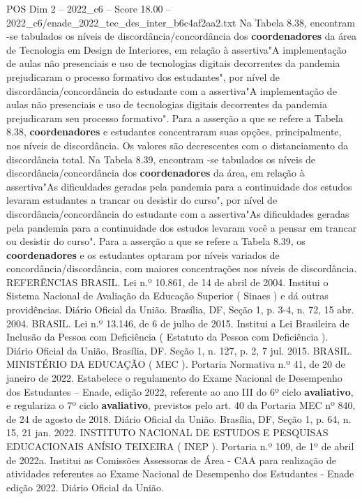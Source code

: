 \begin{textsample}{POS Dim 2 – 2022\_c6 – Score 18.00 – 2022\_c6/enade\_2022\_tec\_des\_inter\_b6c4af2aa2.txt}
Na Tabela 8.38, encontram -se tabulados os níveis de discordância/concordância dos \textbf{coordenadores} da área de Tecnologia em Design de Interiores, em relação à assertiva"A implementação de aulas não presenciais e uso de tecnologias digitais decorrentes da pandemia prejudicaram o processo formativo dos estudantes", por nível de discordância/concordância do estudante com a assertiva"A implementação de aulas não presenciais e uso de tecnologias digitais decorrentes da pandemia prejudicaram seu processo formativo".
Para a asserção a que se refere a Tabela 8.38, \textbf{coordenadores} e estudantes concentraram suas opções, principalmente, nos níveis de discordância.
Os valores são decrescentes com o distanciamento da discordância total.
Na Tabela 8.39, encontram -se tabulados os níveis de discordância/concordância dos \textbf{coordenadores} da área, em relação à assertiva"As dificuldades geradas pela pandemia para a continuidade dos estudos levaram estudantes a trancar ou desistir do curso", por nível de discordância/concordância do estudante com a assertiva"As dificuldades geradas pela pandemia para a continuidade dos estudos levaram você a pensar em trancar ou desistir do curso".
Para a asserção a que se refere a Tabela 8.39, os \textbf{coordenadores} e os estudantes optaram por níveis variados de concordância/discordância, com maiores concentrações nos níveis de discordância.
REFERÊNCIAS BRASIL.
Lei n.º 10.861, de 14 de abril de 2004.
Institui o Sistema Nacional de Avaliação da Educação Superior ( Sinaes ) e dá outras providências.
Diário Oficial da União.
Brasília, DF, Seção 1, p. 3-4, n. 72, 15 abr. 2004.
BRASIL.
Lei n.º 13.146, de 6 de julho de 2015.
Institui a Lei Brasileira de Inclusão da Pessoa com Deficiência ( Estatuto da Pessoa com Deficiência ).
Diário Oficial da União, Brasília, DF.
Seção 1, n. 127, p. 2, 7 jul. 2015.
BRASIL.
MINISTÉRIO DA EDUCAÇÃO ( MEC ).
Portaria Normativa n.º 41, de 20 de janeiro de 2022.
Estabelece o regulamento do Exame Nacional de Desempenho dos Estudantes – Enade, edição 2022, referente ao ano III do 6º ciclo \textbf{avaliativo}, e regulariza o 7º ciclo \textbf{avaliativo}, previstos pelo art. 40 da Portaria MEC nº 840, de 24 de agosto de 2018.
Diário Oficial da União.
Brasília, DF, Seção 1, p. 64, n. 15, 21 jan. 2022.
INSTITUTO NACIONAL DE ESTUDOS E PESQUISAS EDUCACIONAIS ANÍSIO TEIXEIRA ( INEP ).
Portaria n.º 109, de 1º de abril de 2022a.
Institui as Comissões Assessoras de Área - CAA para realização de atividades referentes ao Exame Nacional de Desempenho dos Estudantes - Enade edição 2022.
Diário Oficial da União.

\end{textsample}
